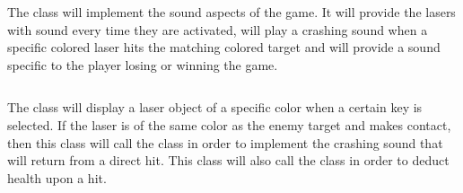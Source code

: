 \inputminted{python}{../code/RenderedBase.py}

The  class will implement the sound
aspects of the game.  It will provide the lasers with sound every
time they are activated, will play a crashing sound when a specific
colored laser hits the matching colored target and will provide a
sound specific to the player losing or winning the game.

\inputminted{python}{../code/GameSound.py}

The  class will display a laser
object of a specific color when a certain key is selected. If the
laser is of the same color as the enemy target and makes contact,
then this class will call the  class
in order to implement the crashing sound that will return from a
direct hit. This class will also call the 
class in order to deduct health upon a hit.

\inputminted{python}{../code/LaserStrike.py}
